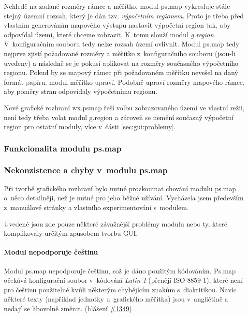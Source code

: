 \documentclass[a4paper,12pt,draft]{article}
\newif\ifbc %
\begin{document}
Nehledě na zadané rozměry rámce a měřítko, modul ps.map vykresluje stále stejný
územní rozsah, který je dán tzv. \emph{výpočetním regionem}.
Proto je třeba před vlastním generováním mapového výstupu
nastavit výpočetní region tak, aby odpovídal území, které chceme
zobrazit. K~tomu slouží modul \emph{g.region}. V~konfigu\-račním souboru
tedy nelze rozsah území ovlivnit.
Modul ps.map tedy nejprve zjistí požadované rozměry a měřítko
z~konfiguračního souboru (jsou-li uvedeny) a následně se je pokusí
aplikovat na rozměry současného výpočetního regionu. Pokud by se mapový
rámec při požadovaném měřítku nevešel na daný formát papíru,
modul měřítko upraví. Podobně upraví rozměry mapového rámce, aby
poměry stran odpovídaly výpočetnímu regionu.

Nové grafické rozhraní wx.psmap řeší volbu zobrazovaného území ve
vlastní režii, není tedy třeba volat modul g.region a zároveň
se nemění současný výpočetní region pro ostatní moduly, více v~části
\ref{sec:gui:problemy}.

\ifbc\else
\subsubsection{Funkcionalita modulu ps.map}
\psmapMoznosti

\fi
\subsubsection{Nekonzistence a chyby v~modulu ps.map}
\label{sec:psmap:chyby}
Při tvorbě grafického rozhraní bylo nutné prozkoumat chování
modulu ps.map o~něco detailněji, než je nutné pro jeho běžné
užívání. Vycházela jsem především z~manu\-álové stránky \cite{manual}
a vlastního experimentování s~modulem.
\ifbc
U některých problémů jsou uvedeny
odkazy na hlášení o~chybách (\emph{bug report}) na vývojářské stránce
GRASSu \cite{trac} využívající systém pro správu projektů
\emph{Trac}\footnote{\url{http://trac.edgewall.org}}.
\else
Uvedené jsou zde pouze některé závažnější problémy modulu nebo ty, které
komplikovaly určitým způsobem tvorbu GUI.
\fi

\paragraph*{Modul nepodporuje češtinu}
\label{sec:psmap:cestina}
Modul ps.map nepodporuje češtinu, což je dáno použitým
kódováním. Ps.map očekává konfigurační soubor v~kódování
\emph{Latin-1} (pře\-něji ISO-8859-1), které není pro češtinu použitelné
kvůli některým chybějícím zna\-kům s~diakritikou. Navíc některé texty
(například jednotky u~grafického měřítka) jsou v~angličtině a nedají se
libovolně změnit. (hlášení \href{https://trac.osgeo.org/grass/ticket/1349}{%
\#1349})
\end{document}
